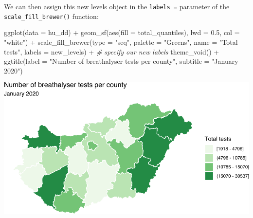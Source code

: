 \documentclass[
]{book}
\newenvironment{Shaded}{\begin{snugshade}}{\end{snugshade}}
\newcommand{\AttributeTok}[1]{\textcolor[rgb]{0.77,0.63,0.00}{#1}}
\newcommand{\CommentTok}[1]{\textcolor[rgb]{0.56,0.35,0.01}{\textit{#1}}}
\newcommand{\FloatTok}[1]{\textcolor[rgb]{0.00,0.00,0.81}{#1}}
\newcommand{\FunctionTok}[1]{\textcolor[rgb]{0.00,0.00,0.00}{#1}}
\newcommand{\NormalTok}[1]{#1}
\newcommand{\OtherTok}[1]{\textcolor[rgb]{0.56,0.35,0.01}{#1}}
\newcommand{\SpecialCharTok}[1]{\textcolor[rgb]{0.00,0.00,0.00}{#1}}
\newcommand{\StringTok}[1]{\textcolor[rgb]{0.31,0.60,0.02}{#1}}
\begin{document}
\begin{Shaded}
\end{Shaded}

We can then assign this new levels object in the \texttt{labels\ =} parameter of the \texttt{scale\_fill\_brewer()} function:

\begin{Shaded}
\begin{Highlighting}[]
\FunctionTok{ggplot}\NormalTok{(}\AttributeTok{data =}\NormalTok{ hu\_dd) }\SpecialCharTok{+} 
  \FunctionTok{geom\_sf}\NormalTok{(}\FunctionTok{aes}\NormalTok{(}\AttributeTok{fill =}\NormalTok{ total\_quantiles), }
          \AttributeTok{lwd =} \FloatTok{0.5}\NormalTok{, }\AttributeTok{col =} \StringTok{"white"}\NormalTok{) }\SpecialCharTok{+} 
  \FunctionTok{scale\_fill\_brewer}\NormalTok{(}\AttributeTok{type =} \StringTok{"seq"}\NormalTok{, }\AttributeTok{palette =} \StringTok{"Greens"}\NormalTok{, }
                    \AttributeTok{name =} \StringTok{"Total tests"}\NormalTok{, }
                    \AttributeTok{labels =}\NormalTok{ new\_levels) }\SpecialCharTok{+}  \CommentTok{\# specify our new labels}
  \FunctionTok{theme\_void}\NormalTok{() }\SpecialCharTok{+} 
  \FunctionTok{ggtitle}\NormalTok{(}\AttributeTok{label =} \StringTok{"Number of breathalyser tests per county"}\NormalTok{, }
          \AttributeTok{subtitle =} \StringTok{"January 2020"}\NormalTok{)}
\end{Highlighting}
\end{Shaded}

\includegraphics{crime_mapping_files/figure-latex/legendlabelsplot-1.pdf}
\end{document}
